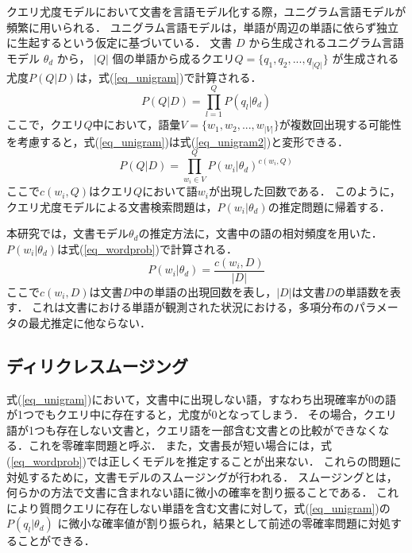 クエリ尤度モデルにおいて文書を言語モデル化する際，ユニグラム言語モデルが頻繁に用いられる．
ユニグラム言語モデルは，単語が周辺の単語に依らず独立に生起するという仮定に基づいている．
文書 $D$ から生成されるユニグラム言語モデル $\theta_d$ から， $|Q|$ 個の単語から成るクエリ$Q = \{q_1, q_2, ..., q_{|Q|}\}$ が生成される尤度$P(Q|D)$は，式(\ref{eq_unigram})で計算される．
\begin{equation}
    P(Q|D) = \prod^{Q}_{l=1}P(q_l|\theta_d) \label{eq_unigram}
\end{equation}
ここで，クエリ$Q$中において，語彙$V = \{w_1, w_2, ..., w_|V|\}$が複数回出現する可能性を考慮すると，式(\ref{eq_unigram})は式(\ref{eq_unigram2})と変形できる．
\begin{equation}
    P(Q|D) = \prod^{Q}_{w_i \in V}P(w_i|\theta_d)^{c(w_i, Q)} \label{eq_unigram2}
\end{equation}
ここで$c(w_i, Q)$はクエリ$Q$において語$w_i$が出現した回数である．
このように，クエリ尤度モデルによる文書検索問題は，$P(w_i|\theta_d)$の推定問題に帰着する．

本研究では，文書モデル$\theta_d$の推定方法に，文書中の語の相対頻度を用いた．
$P(w_i|\theta_d)$は式(\ref{eq_wordprob})で計算される．
\begin{equation}
    P(w_i|\theta_d) = \frac{c(w_i,D)}{|D|}    \label{eq_wordprob}
\end{equation}
ここで$c(w_i,D)$は文書$D$中の単語の出現回数を表し，$|D|$は文書$D$の単語数を表す．
これは文書における単語が観測された状況における，多項分布のパラメータの最尤推定に他ならない．

\subsection{ディリクレスムージング}  \label{sec_dirichlet}
式(\ref{eq_unigram})において，文書中に出現しない語，すなわち出現確率が0の語が1つでもクエリ中に存在すると，尤度が0となってしまう．
その場合，クエリ語が1つも存在しない文書と，クエリ語を一部含む文書との比較ができなくなる．これを零確率問題と呼ぶ．
また，文書長が短い場合には，式(\ref{eq_wordprob})では正しくモデルを推定することが出来ない．
これらの問題に対処するために，文書モデルのスムージングが行われる．
スムージングとは，何らかの方法で文書に含まれない語に微小の確率を割り振ることである．
これにより質問クエリに存在しない単語を含む文書に対して，式(\ref{eq_unigram})の $P(q_l|\theta_d)$ に微小な確率値が割り振られ，結果として前述の零確率問題に対処することができる．


